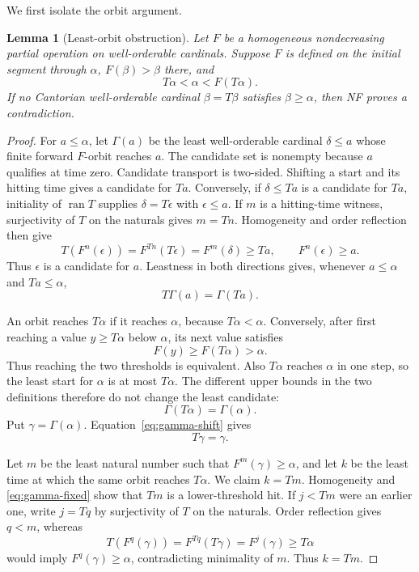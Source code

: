 \documentclass[11pt]{article}
\newtheorem{lemma}[theorem]{Lemma}
\numberwithin{equation}{section}
\theoremstyle{definition}
\theoremstyle{remark}
\begin{document}
We first isolate the orbit argument.

\begin{lemma}[Least-orbit obstruction]\label{lem:orbit}
Let $F$ be a homogeneous nondecreasing partial operation on
well-orderable cardinals.  Suppose $F$ is defined on the initial segment
through $\alpha$, $F(\beta)>\beta$ there, and
\begin{equation}
 T\alpha<\alpha<F(T\alpha).
 \label{eq:sandwich}
\end{equation}
If no Cantorian well-orderable cardinal $\beta=T\beta$ satisfies
$\beta\geq\alpha$, then NF proves a contradiction.
\end{lemma}

\begin{proof}
For $a\leq\alpha$, let $\Gamma(a)$ be the least well-orderable
cardinal $\delta\leq a$ whose finite forward $F$-orbit reaches $a$.
The candidate set is nonempty because $a$ qualifies at time zero.
Candidate transport is two-sided.  Shifting a start and its hitting time
gives a candidate for $Ta$.  Conversely, if $\delta\leq Ta$ is a candidate
for $Ta$, initiality of $\operatorname{ran}T$ supplies
$\delta=T\epsilon$ with $\epsilon\leq a$.  If $m$ is a hitting-time
witness, surjectivity of $T$ on the naturals gives $m=Tn$.  Homogeneity and
order reflection then give
\[
 T(F^n(\epsilon))=F^{Tn}(T\epsilon)=F^m(\delta)\geq Ta,
 \qquad F^n(\epsilon)\geq a.
\]
Thus $\epsilon$ is a candidate for $a$.  Leastness in both directions
gives, whenever $a\leq\alpha$ and $Ta\leq\alpha$,
\begin{equation}
 T\Gamma(a)=\Gamma(Ta).
 \label{eq:gamma-shift}
\end{equation}

An orbit reaches $T\alpha$ if it reaches $\alpha$, because
$T\alpha<\alpha$.  Conversely, after first reaching a value
$y\geq T\alpha$ below $\alpha$, its next value satisfies
\[
 F(y)\geq F(T\alpha)>\alpha.
\]
Thus reaching the two thresholds is equivalent.  Also $T\alpha$ reaches
$\alpha$ in one step, so the least start for $\alpha$ is at most
$T\alpha$.  The different upper bounds in the two definitions therefore
do not change the least candidate:
\[
 \Gamma(T\alpha)=\Gamma(\alpha).
\]
Put $\gamma=\Gamma(\alpha)$.  Equation~\eqref{eq:gamma-shift} gives
\begin{equation}
 T\gamma=\gamma.
 \label{eq:gamma-fixed}
\end{equation}

Let $m$ be the least natural number such that
\(F^m(\gamma)\geq\alpha\), and let $k$ be the least time at which the
same orbit reaches $T\alpha$.  We claim $k=Tm$.  Homogeneity and
\eqref{eq:gamma-fixed} show that $Tm$ is a lower-threshold hit.  If
$j<Tm$ were an earlier one, write $j=Tq$ by surjectivity of $T$ on the
naturals.  Order reflection gives $q<m$, whereas
\[
 T(F^q(\gamma))=F^{Tq}(T\gamma)=F^j(\gamma)\geq T\alpha
\]
would imply $F^q(\gamma)\geq\alpha$, contradicting minimality of $m$.
Thus $k=Tm$.


\end{proof}
\end{document}
